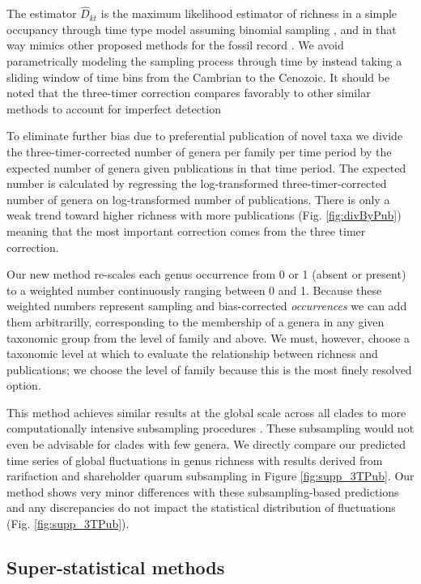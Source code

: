 \documentclass[12pt]{article}
\let\citep=\cite
\begin{document}
The estimator $\hat{D}_{kt}$ is the maximum likelihood estimator of
richness in a simple occupancy through time type model assuming
binomial sampling \citep{}, and in that way mimics other proposed
methods for the fossil record \citep{foote2016, starrfelt2016}. We
avoid parametrically modeling the sampling process through time by
instead taking a sliding window of time bins from the Cambrian to the
Cenozoic. It should be noted that the three-timer correction compares
favorably to other similar methods to account for imperfect detection
\citep{alroy2014}

To eliminate further bias due to preferential publication of novel
taxa \citep{alroy2010} we divide the three-timer-corrected number of
genera per family per time period by the expected number of genera
given publications in that time period.  The expected number is
calculated by regressing the log-transformed three-timer-corrected
number of genera on log-transformed number of publications. There is
only a weak trend toward higher richness with more publications
(Fig. \ref{fig:divByPub}) meaning that the most important correction
comes from the three timer correction.

Our new method re-scales each genus occurrence from 0 or 1 (absent or
present) to a weighted number continuously ranging between 0 and
1. Because these weighted numbers represent sampling and
bias-corrected {\it occurrences} we can add them arbitrarilly,
corresponding to the membership of a genera in any given taxonomic
group from the level of family and above.  We must, however, choose a
taxonomic level at which to evaluate the relationship between richness
and publications; we choose the level of family because this is the
most finely resolved option.

This method achieves similar results at the global scale across all
clades to more computationally intensive subsampling procedures
\citep{miller1996, alroy2010, kocsis2018}. These subsampling would not
even be advisable for clades with few genera. We directly compare our
predicted time series of global fluctuations in genus richness with
results derived from rarifaction and shareholder quarum subsampling
\citep[SQS;][]{kocsis2018} in Figure \ref{fig:supp_3TPub}.  Our method
shows very minor differences with these subsampling-based predictions
and any discrepancies do not impact the statistical distribution of
fluctuations (Fig. \ref{fig:supp_3TPub}).


\subsection*{Super-statistical methods} \label{sec:numMeth}
\end{document}
